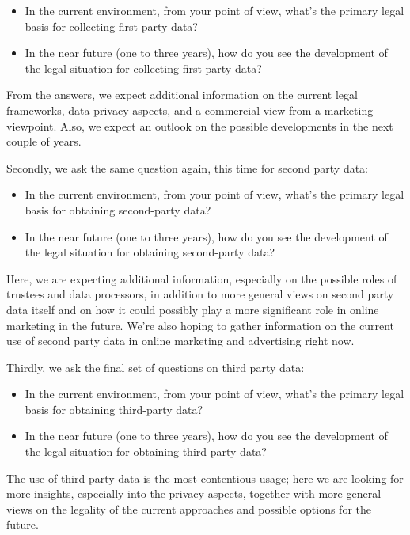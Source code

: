 \begin{itemize}
 \item In the current environment, from your point of view, what's the primary legal basis for collecting first-party data?
 \item In the near future (one to three years), how do you see the development of the legal situation for collecting first-party data?
\end{itemize}
 
From the answers, we expect additional information on the current legal frameworks, data privacy aspects, and a commercial view from a marketing viewpoint. Also, we expect an outlook on the possible developments in the next couple of years.
 
Secondly, we ask the same question again, this time for second party data:

\begin{itemize} 
 \item In the current environment, from your point of view, what's the primary legal basis for obtaining second-party data?
 \item In the near future (one to three years), how do you see the development of the legal situation for obtaining second-party data?
\end{itemize}

Here, we are expecting additional information, especially on the possible roles of trustees and data processors, in addition to more general views on second party data itself and on how it could possibly play a more significant role in online marketing in the future. We're also hoping to gather information on the current use of second party data in online marketing and advertising right now.
 
Thirdly, we ask the final set of questions on third party data:

\begin{itemize} 
 \item In the current environment, from your point of view, what's the primary legal basis for obtaining third-party data?
 \item In the near future (one to three years), how do you see the development of the legal situation for obtaining third-party data?
\end{itemize} 
 
The use of third party data is the most contentious usage; here we are looking for more insights, especially into the privacy aspects, together with more general views on the legality of the current approaches and possible options for the future.

